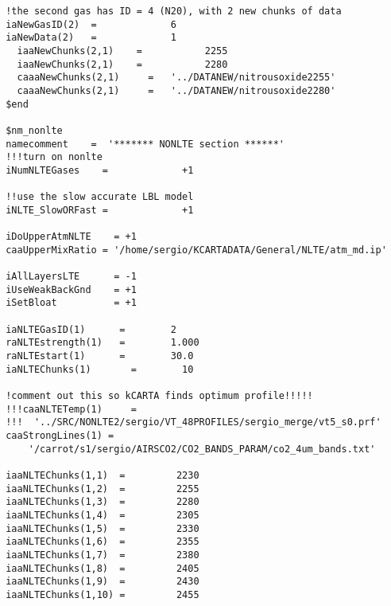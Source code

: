 \documentclass[12pt]{article}
\begin{document}
\begin{scriptsize}
\begin{verbatim}
 !the second gas has ID = 4 (N20), with 2 new chunks of data
 iaNewGasID(2)  =             6
 iaNewData(2)   =             1
   iaaNewChunks(2,1)    =           2255
   iaaNewChunks(2,1)    =           2280
   caaaNewChunks(2,1)     =   '../DATANEW/nitrousoxide2255'
   caaaNewChunks(2,1)     =   '../DATANEW/nitrousoxide2280'
 $end

 $nm_nonlte 
 namecomment    =  '******* NONLTE section ******' 
 !!!turn on nonlte
 iNumNLTEGases    =             +1 

 !!use the slow accurate LBL model
 iNLTE_SlowORFast =             +1

 iDoUpperAtmNLTE    = +1
 caaUpperMixRatio = '/home/sergio/KCARTADATA/General/NLTE/atm_md.ip'

 iAllLayersLTE      = -1
 iUseWeakBackGnd    = +1
 iSetBloat          = +1

 iaNLTEGasID(1)      =        2
 raNLTEstrength(1)   =        1.000
 raNLTEstart(1)      =        30.0
 iaNLTEChunks(1)       =        10

 !comment out this so kCARTA finds optimum profile!!!!!
 !!!caaNLTETemp(1)     = 
 !!!  '../SRC/NONLTE2/sergio/VT_48PROFILES/sergio_merge/vt5_s0.prf'
 caaStrongLines(1) = 
     '/carrot/s1/sergio/AIRSCO2/CO2_BANDS_PARAM/co2_4um_bands.txt'

 iaaNLTEChunks(1,1)  =         2230
 iaaNLTEChunks(1,2)  =         2255
 iaaNLTEChunks(1,3)  =         2280
 iaaNLTEChunks(1,4)  =         2305
 iaaNLTEChunks(1,5)  =         2330
 iaaNLTEChunks(1,6)  =         2355
 iaaNLTEChunks(1,7)  =         2380
 iaaNLTEChunks(1,8)  =         2405
 iaaNLTEChunks(1,9)  =         2430
 iaaNLTEChunks(1,10) =         2455


\end{verbatim}
\end{scriptsize}
\end{document}
